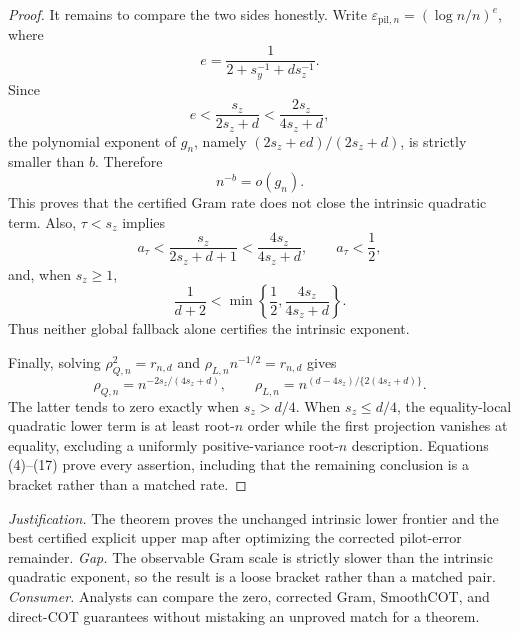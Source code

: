 \documentclass{article}
\begin{document}
\begin{proof}
It remains to compare the two sides honestly. Write \(\varepsilon_{\mathrm{pil},n}=(\log n/n)^e\), where
\[
e=\frac1{2+s_y^{-1}+ds_z^{-1}}.
\]
Since
\[
e<\frac{s_z}{2s_z+d}<\frac{2s_z}{4s_z+d},                       \tag{13}
\]
the polynomial exponent of \(g_n\), namely \((2s_z+ed)/(2s_z+d)\), is strictly smaller than \(b\). Therefore
\[
n^{-b}=o(g_n).                                                    \tag{14}
\]
This proves that the certified Gram rate does not close the intrinsic quadratic term. Also, \(\tau<s_z\) implies
\[
a_\tau<\frac{s_z}{2s_z+d+1}<\frac{4s_z}{4s_z+d},
\qquad a_\tau<\frac12,                                          \tag{15}
\]
and, when \(s_z\ge1\),
\[
\frac1{d+2}<\min\!\left\{\frac12,\frac{4s_z}{4s_z+d}\right\}. \tag{16}
\]
Thus neither global fallback alone certifies the intrinsic exponent.

Finally, solving \(\rho_{Q,n}^2=r_{n,d}\) and \(\rho_{L,n}n^{-1/2}=r_{n,d}\) gives
\[
\rho_{Q,n}=n^{-2s_z/(4s_z+d)},
\qquad
\rho_{L,n}=n^{(d-4s_z)/\{2(4s_z+d)\}}.                          \tag{17}
\]
The latter tends to zero exactly when \(s_z>d/4\). When \(s_z\le d/4\), the equality-local quadratic lower term is at least root-\(n\) order while the first projection vanishes at equality, excluding a uniformly positive-variance root-\(n\) description. Equations (4)--(17) prove every assertion, including that the remaining conclusion is a bracket rather than a matched rate.
\end{proof}
\par\smallskip\noindent \textit{Justification.} The theorem proves the unchanged intrinsic lower frontier and the best certified explicit upper map after optimizing the corrected pilot-error remainder. \textit{Gap.} The observable Gram scale is strictly slower than the intrinsic quadratic exponent, so the result is a loose bracket rather than a matched pair. \textit{Consumer.} Analysts can compare the zero, corrected Gram, SmoothCOT, and direct-COT guarantees without mistaking an unproved match for a theorem.
\end{document}
